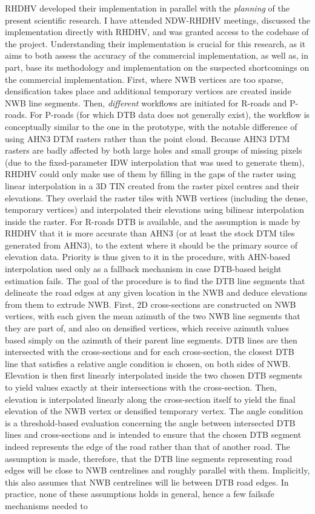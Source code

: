 RHDHV developed their implementation in parallel with the \textit{planning} of the present scientific research. I have attended NDW-RHDHV meetings, discussed the implementation directly with RHDHV, and was granted access to the codebase of the project. Understanding their implementation is crucial for this research, as it aims to both assess the accuracy of the commercial implementation, as well as, in part, base its methodology and implementation on the suspected shortcomings on the commercial implementation. First, where NWB vertices are too sparse, densification takes place and additional temporary vertices are created inside NWB line segments. Then, \textit{different} workflows are initiated for R-roads and P-roads. For P-roads (for which DTB data does not generally exist), the workflow is conceptually similar to the one in the prototype, with the notable difference of using AHN3 DTM rasters rather than the point cloud. Because AHN3 DTM rasters are badly affected by both large holes and small groups of missing pixels (due to the fixed-parameter IDW interpolation that was used to generate them), RHDHV could only make use of them by filling in the gaps of the raster using linear interpolation in a 3D TIN created from the raster pixel centres and their elevations. They overlaid the raster tiles with NWB vertices (including the dense, temporary vertices) and interpolated their elevations using bilinear interpolation inside the raster. For R-roads DTB is available, and the assumption is made by RHDHV that it is more accurate than AHN3 (or at least the stock DTM tiles generated from AHN3), to the extent where it should be the primary source of elevation data. Priority is thus given to it in the procedure, with AHN-based interpolation used only as a fallback mechanism in case DTB-based height estimation fails. The goal of the procedure is to find the DTB line segments that delineate the road edges at any given location in the NWB and deduce elevations from them to extrude NWB. First, 2D cross-sections are constructed on NWB vertices, with each given the mean azimuth of the two NWB line segments that they are part of, and also on densified vertices, which receive azimuth values based simply on the azimuth of their parent line segments. DTB lines are then intersected with the cross-sections and for each cross-section, the closest DTB line that satisfies a relative angle condition is chosen, on both sides of NWB. Elevation is then first linearly interpolated inside the two chosen DTB segments to yield values exactly at their intersections with the cross-section. Then, elevation is interpolated linearly along the cross-section itself to yield the final elevation of the NWB vertex or densified temporary vertex. The angle condition is a threshold-based evaluation concerning the angle between intersected DTB lines and cross-sections and is intended to ensure that the chosen DTB segment indeed represents the edge of the road rather than that of another road. The assumption is made, therefore, that the DTB line segments representing road edges will be close to NWB centrelines and roughly parallel with them. Implicitly, this also assumes that NWB centrelines will lie between DTB road edges. In practice, none of these assumptions holds in general, hence a few failsafe mechanisms needed to 